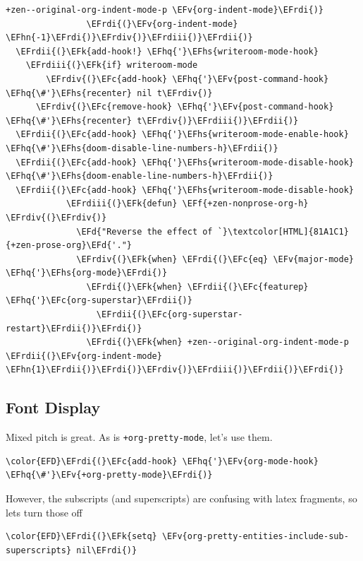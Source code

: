 \documentclass{scrartcl}
\newcommand{\EFk}[1]{\textcolor{EFk}{#1}} %
\newcommand{\EFd}[1]{\textcolor{EFd}{#1}} %
\newcommand{\EFc}[1]{\textcolor{EFc}{#1}} %
\newcommand{\EFv}[1]{\textcolor{EFv}{#1}} %
\newcommand{\EFf}[1]{\textcolor{EFf}{#1}} %
\newcommand{\EFhn}[1]{#1} %
\newcommand{\EFhq}[1]{#1} %
\newcommand{\EFhs}[1]{#1} %
\newcommand{\EFrdi}[1]{#1} %
\newcommand{\EFrdii}[1]{#1} %
\newcommand{\EFrdiii}[1]{#1} %
\newcommand{\EFrdiv}[1]{#1} %
\begin{document}
\begin{Code}
\begin{Verbatim}[]
                 +zen--original-org-indent-mode-p \EFv{org-indent-mode}\EFrdi{)}
                \EFrdi{(}\EFv{org-indent-mode} \EFhn{-1}\EFrdi{)}\EFrdiv{)}\EFrdiii{)}\EFrdii{)}
  \EFrdii{(}\EFk{add-hook!} \EFhq{'}\EFhs{writeroom-mode-hook}
    \EFrdiii{(}\EFk{if} writeroom-mode
        \EFrdiv{(}\EFc{add-hook} \EFhq{'}\EFv{post-command-hook} \EFhq{\#'}\EFhs{recenter} nil t\EFrdiv{)}
      \EFrdiv{(}\EFc{remove-hook} \EFhq{'}\EFv{post-command-hook} \EFhq{\#'}\EFhs{recenter} t\EFrdiv{)}\EFrdiii{)}\EFrdii{)}
  \EFrdii{(}\EFc{add-hook} \EFhq{'}\EFhs{writeroom-mode-enable-hook} \EFhq{\#'}\EFhs{doom-disable-line-numbers-h}\EFrdii{)}
  \EFrdii{(}\EFc{add-hook} \EFhq{'}\EFhs{writeroom-mode-disable-hook} \EFhq{\#'}\EFhs{doom-enable-line-numbers-h}\EFrdii{)}
  \EFrdii{(}\EFc{add-hook} \EFhq{'}\EFhs{writeroom-mode-disable-hook}
            \EFrdiii{(}\EFk{defun} \EFf{+zen-nonprose-org-h} \EFrdiv{(}\EFrdiv{)}
              \EFd{"Reverse the effect of `}\textcolor[HTML]{81A1C1}{+zen-prose-org}\EFd{'."}
              \EFrdiv{(}\EFk{when} \EFrdi{(}\EFc{eq} \EFv{major-mode} \EFhq{'}\EFhs{org-mode}\EFrdi{)}
                \EFrdi{(}\EFk{when} \EFrdii{(}\EFc{featurep} \EFhq{'}\EFc{org-superstar}\EFrdii{)}
                  \EFrdii{(}\EFc{org-superstar-restart}\EFrdii{)}\EFrdi{)}
                \EFrdi{(}\EFk{when} +zen--original-org-indent-mode-p \EFrdii{(}\EFv{org-indent-mode} \EFhn{1}\EFrdii{)}\EFrdi{)}\EFrdiv{)}\EFrdiii{)}\EFrdii{)}\EFrdi{)}
\end{Verbatim}
\end{Code}

\subsection{Font Display}
\label{sec:orgd4d4212}
Mixed pitch is great. As is \texttt{+org-pretty-mode}, let's use them.
\begin{Code}
\begin{Verbatim}[]
\color{EFD}\EFrdi{(}\EFc{add-hook} \EFhq{'}\EFv{org-mode-hook} \EFhq{\#'}\EFv{+org-pretty-mode}\EFrdi{)}
\end{Verbatim}
\end{Code}

However, the subscripts (and superscripts) are confusing with latex fragments,
so lets turn those off
\begin{Code}
\begin{Verbatim}[]
\color{EFD}\EFrdi{(}\EFk{setq} \EFv{org-pretty-entities-include-sub-superscripts} nil\EFrdi{)}
\end{Verbatim}
\end{Code}
\end{document}
